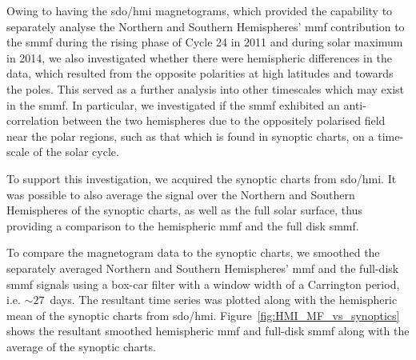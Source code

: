 Owing to having the \gls{sdo/hmi} magnetograms, which provided the capability to separately analyse the Northern and Southern Hemispheres' \gls{mmf} contribution to the \gls{smmf} during the rising phase of Cycle 24 in 2011 and during solar maximum in 2014, we also investigated whether there were hemispheric differences in the data, which resulted from the opposite polarities at high latitudes and towards the poles. This served as a further analysis into other timescales which may exist in the \gls{smmf}. In particular, we investigated if the \gls{smmf} exhibited an anti-correlation between the two hemispheres due to the oppositely polarised field near the polar regions, such as that which is found in synoptic charts, on a time-scale of the solar cycle.

To support this investigation, we acquired the synoptic charts from \gls{sdo/hmi}. It was possible to also average the signal over the Northern and Southern Hemispheres of the synoptic charts, as well as the full solar surface, thus providing a comparison to the hemispheric \gls{mmf} and the full disk \gls{smmf}.

To compare the magnetogram data to the synoptic charts, we smoothed the separately averaged Northern and Southern Hemispheres' \gls{mmf} and the full-disk \gls{smmf} signals using a box-car filter with a window width of a Carrington period, i.e. $\sim 27$~days. The resultant time series was plotted along with the hemispheric mean of the synoptic charts from \gls{sdo/hmi}. Figure~\ref{fig:HMI_MF_vs_synoptics} shows the resultant smoothed hemispheric \gls{mmf} and full-disk \gls{smmf} along with the average of the synoptic charts.

